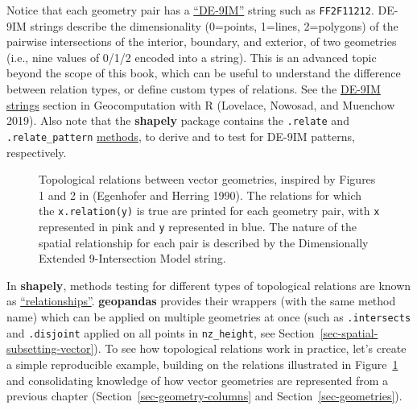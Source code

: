 \documentclass[
  letterpaper,
]{krantz}
\begin{document}
\begin{tcolorbox}[enhanced jigsaw, title=\textcolor{quarto-callout-note-color}{\faInfo}\hspace{0.5em}{Note}, arc=.35mm, toprule=.15mm, titlerule=0mm, colframe=quarto-callout-note-color-frame, breakable, toptitle=1mm, bottomtitle=1mm, rightrule=.15mm, colbacktitle=quarto-callout-note-color!10!white, leftrule=.75mm, left=2mm, bottomrule=.15mm, opacityback=0, coltitle=black, opacitybacktitle=0.6, colback=white]

Notice that each geometry pair has a
\href{https://en.wikipedia.org/wiki/DE-9IM}{``DE-9IM''} string such as
\texttt{FF2F11212}. DE-9IM strings describe the dimensionality
(0=points, 1=lines, 2=polygons) of the pairwise intersections of the
interior, boundary, and exterior, of two geometries (i.e., nine values
of 0/1/2 encoded into a string). This is an advanced topic beyond the
scope of this book, which can be useful to understand the difference
between relation types, or define custom types of relations. See the
\href{https://r.geocompx.org/spatial-operations\#de-9im-strings}{DE-9IM
strings} section in Geocomputation with R (Lovelace, Nowosad, and
Muenchow 2019). Also note that the \textbf{shapely} package contains the
\texttt{.relate} and \texttt{.relate\_pattern}
\href{https://shapely.readthedocs.io/en/stable/manual.html\#de-9im-relationships}{methods},
to derive and to test for DE-9IM patterns, respectively.

\end{tcolorbox}

\begin{figure}


\caption{\label{fig-spatial-relations}Topological relations between
vector geometries, inspired by Figures 1 and 2 in (Egenhofer and Herring
1990). The relations for which the \texttt{x.relation(y)} is true are
printed for each geometry pair, with \texttt{x} represented in pink and
\texttt{y} represented in blue. The nature of the spatial relationship
for each pair is described by the Dimensionally Extended 9-Intersection
Model string.}

\end{figure}%

In \textbf{shapely}, methods testing for different types of topological
relations are known as
\href{https://shapely.readthedocs.io/en/stable/manual.html\#relationships}{``relationships''}.
\textbf{geopandas} provides their wrappers (with the same method name)
which can be applied on multiple geometries at once (such as
\texttt{.intersects} and \texttt{.disjoint} applied on all points in
\texttt{nz\_height}, see Section~\ref{sec-spatial-subsetting-vector}).
To see how topological relations work in practice, let's create a simple
reproducible example, building on the relations illustrated in
Figure~\ref{fig-spatial-relations} and consolidating knowledge of how
vector geometries are represented from a previous chapter
(Section~\ref{sec-geometry-columns} and Section~\ref{sec-geometries}).
\end{document}
